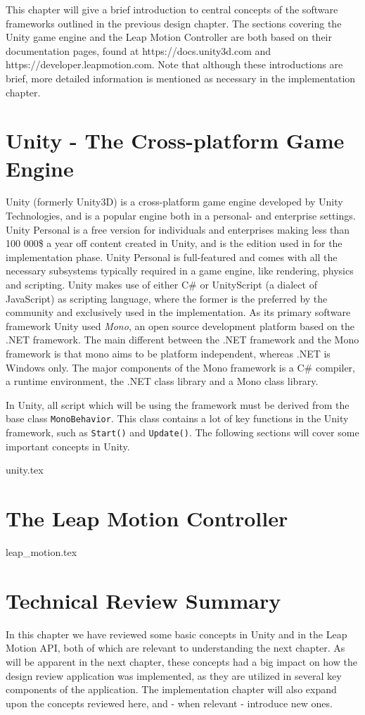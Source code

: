 This chapter will give a brief introduction to central concepts of the software frameworks outlined in the previous design chapter.
The sections covering the Unity game engine and the Leap Motion Controller are both based on their documentation pages, found at 
https://docs.unity3d.com and https://developer.leapmotion.com.
Note that although these introductions are brief, more detailed information is mentioned as necessary in the implementation chapter.

\section{Unity - The Cross-platform Game Engine}
Unity (formerly Unity3D) is a cross-platform game engine developed by Unity Technologies, and is a popular engine both in a personal- and enterprise settings.
Unity Personal is a free version for individuals and enterprises making less than 100 000\$ a year off content created in Unity, and is the 
edition used in for the implementation phase.
Unity Personal is full-featured and comes with all the necessary subsystems typically required in a game engine, like rendering, physics and scripting.
Unity makes use of either C\# or UnityScript (a dialect of JavaScript) as scripting language, where the former is the preferred by the community and 
exclusively used in the implementation. As its primary software framework Unity used \textit{Mono}, an open source development platform based on the .NET
framework. The main different between the .NET framework and the Mono framework is that mono aims to be platform independent, whereas .NET is Windows only.
The major components of the Mono framework is a C\# compiler, a runtime environment, the .NET class library and a Mono class library.

In Unity, all script which will be using the framework must be derived from the base class \texttt{MonoBehavior}. 
This class contains a lot of key functions in the Unity framework, such as \texttt{Start()} and \texttt{Update()}. 
The following sections will cover some important concepts in Unity.

{unity.tex}

\section{The Leap Motion Controller}
{leap_motion.tex}

\section{Technical Review Summary}
In this chapter we have reviewed some basic concepts in Unity and in the Leap Motion API, both of which are relevant to understanding the next chapter. 
As will be apparent in the next chapter, these concepts had a big impact on how the design review application was implemented, as 
they are utilized in several key components of the application.
The implementation chapter will also expand upon the concepts reviewed here, and - when relevant - introduce new ones.

